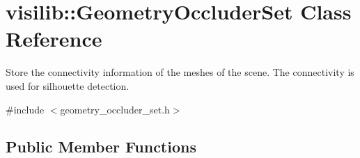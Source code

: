 \hypertarget{classvisilib_1_1_geometry_occluder_set}{}\section{visilib\+::Geometry\+Occluder\+Set Class Reference}
\label{classvisilib_1_1_geometry_occluder_set}


Store the connectivity information of the meshes of the scene. The connectivity is used for silhouette detection.  




{\ttfamily \#include $<$geometry\+\_\+occluder\+\_\+set.\+h$>$}

\subsection*{Public Member Functions}
